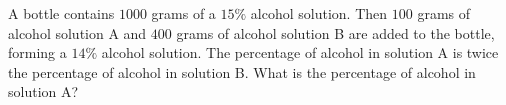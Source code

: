 A bottle contains $1000$ grams of a $15\%$ alcohol solution. Then $100$ grams of alcohol solution A and $400$ grams of alcohol solution B are added to the bottle, forming a $14\%$ alcohol solution. The percentage of alcohol in solution A is twice the percentage of alcohol in solution B. What is the percentage of alcohol in solution A?
